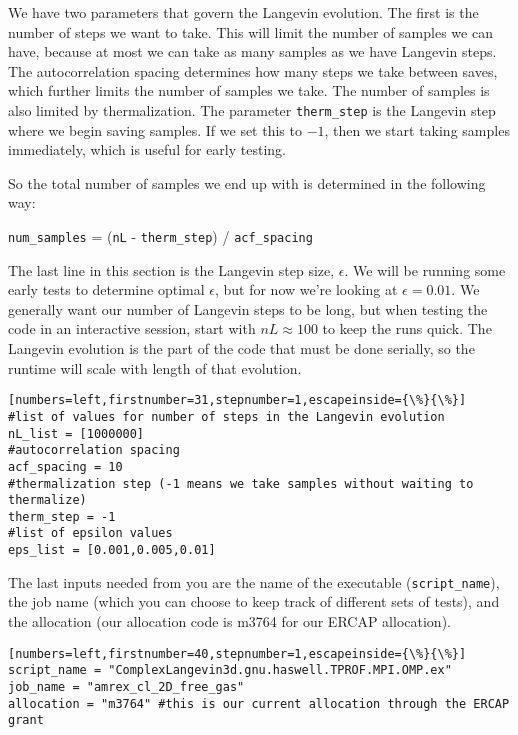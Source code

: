 \documentclass[../RotatingBosons.tex]{subfiles}
\begin{document}
We have two parameters that govern the Langevin evolution. The first is the number of steps we want to take. This will limit the number of samples we can have, because at most we can take as many samples as we have Langevin steps. The autocorrelation spacing determines how many steps we take between saves, which further limits the number of samples we take. The number of samples is also limited by thermalization. The parameter \lstinline{therm_step} is the Langevin step where we begin saving samples. If we set this to $-1$, then we start taking samples immediately, which is useful for early testing.

So the total number of samples we end up with is determined in the following way: 

\lstinline{num_samples} = (\lstinline{nL} - \lstinline{therm_step}) / \lstinline{acf_spacing}

The last line in this section is the Langevin step size, $\epsilon$. We will be running some early tests to determine optimal $\epsilon$, but for now we're looking at $\epsilon = 0.01$. We generally want our number of Langevin steps to be long, but when testing the code in an interactive session, start with $nL \approx 100$ to keep the runs quick. The Langevin evolution is the part of the code that must be done serially, so the runtime will scale with length of that evolution.

\begin{lstlisting}[numbers=left,firstnumber=31,stepnumber=1,escapeinside={\%}{\%}]
#list of values for number of steps in the Langevin evolution
nL_list = [1000000]
#autocorrelation spacing
acf_spacing = 10
#thermalization step (-1 means we take samples without waiting to thermalize)
therm_step = -1
#list of epsilon values 
eps_list = [0.001,0.005,0.01]
\end{lstlisting}

The last inputs needed from you are the name of the executable (\lstinline{script_name}), the job name (which you can choose to keep track of different sets of tests), and the allocation (our allocation code is m3764 for our ERCAP allocation).

\begin{lstlisting}[numbers=left,firstnumber=40,stepnumber=1,escapeinside={\%}{\%}]
script_name = "ComplexLangevin3d.gnu.haswell.TPROF.MPI.OMP.ex"
job_name = "amrex_cl_2D_free_gas"
allocation = "m3764" #this is our current allocation through the ERCAP grant
\end{lstlisting}
\end{document}
